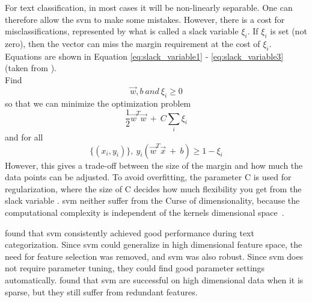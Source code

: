 For text classification, in most cases it will be non-linearly separable. 
One can therefore allow the \gls{svm} to make some mistakes.
However, there is a cost for misclassifications, represented by what is called a slack variable $\xi_{i}$.
If $\xi_{i}$ is set (not zero), then the vector can miss the margin requirement at the cost of $\xi_{i}$.
Equations are shown in Equation \ref{eq:slack_variable1} - \ref{eq:slack_variable3} (taken from \cite[p.~301]{Manning2008}). \\
Find
\begin{equation}\label{eq:slack_variable1}
\vec{w}, b~and~\xi_{i} \geq 0
\end{equation}
so that we can minimize the optimization problem
\begin{equation}\label{eq:slack_variable2}
\frac{1}{2}\vec{w}^{T}\vec{w}~+~C\sum_{i}\xi_{i}
\end{equation}
and for all
\begin{equation}\label{eq:slack_variable3}
\{(x_{i}, y_{i})\},~y_{i}(\vec{w}^{T}\vec{x}~+~b) \geq 1 - \xi_{i}
\end{equation}
However, this gives a trade-off between the size of the margin and how much the data points can be adjusted. 
To avoid overfitting, the parameter C is used for regularization, where the size of C decides how much flexibility you get from the slack variable \cite{Manning2008}.
\gls{svm} neither suffer from the Curse of dimensionality, because the computational complexity is independent of the kernels dimensional space~\cite{Theodoridis2009}.



\textcite{Joachims1998} found that \gls{svm} consistently achieved good performance during text categorization. 
Since \gls{svm} could generalize in high dimensional feature space, the need for feature selection was removed, and \gls{svm} was also robust. 
Since \gls{svm} does not require parameter tuning, they could find good parameter settings automatically. 
\textcite{Loni2011} found that \gls{svm} are successful on high dimensional data when it is sparse, but they still suffer from redundant features. 

